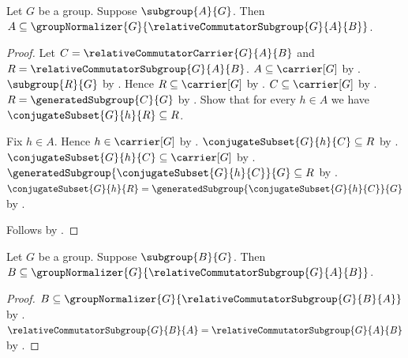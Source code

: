 \begin{theorem}\label{left_subgroup_normalizes_relative_commutator}
    Let $G$ be a group.
    Suppose $\subgroup{A}{G}$.
    Then
        $A\subseteq
            \groupNormalizer{G}{
                \relativeCommutatorSubgroup{G}{A}{B}}$.
\end{theorem}
\begin{proof}
    Let $C=\relativeCommutatorCarrier{G}{A}{B}$ and
        $R=\relativeCommutatorSubgroup{G}{A}{B}$.
    $A\subseteq\carrier[G]$ by .
    $\subgroup{R}{G}$ by
        .
    Hence $R\subseteq\carrier[G]$ by .
    $C\subseteq\carrier[G]$ by
        .
    $R=\generatedSubgroup{C}{G}$ by
        .
    Show that for every $h\in A$ we have
        $\conjugateSubset{G}{h}{R}\subseteq R$.
    \begin{subproof}
        Fix $h\in A$.
        Hence $h\in\carrier[G]$ by .
        $\conjugateSubset{G}{h}{C}\subseteq R$ by
            .
        $\conjugateSubset{G}{h}{C}\subseteq\carrier[G]$ by
            .
        $\generatedSubgroup{\conjugateSubset{G}{h}{C}}{G}
            \subseteq R$ by
            .
        $\conjugateSubset{G}{h}{R}=
            \generatedSubgroup{\conjugateSubset{G}{h}{C}}{G}$ by
            .
    \end{subproof}
    Follows by
        .
\end{proof}

\begin{theorem}\label{right_subgroup_normalizes_relative_commutator}
    Let $G$ be a group.
    Suppose $\subgroup{B}{G}$.
    Then
        $B\subseteq
            \groupNormalizer{G}{
                \relativeCommutatorSubgroup{G}{A}{B}}$.
\end{theorem}
\begin{proof}
    $B\subseteq
        \groupNormalizer{G}{
            \relativeCommutatorSubgroup{G}{B}{A}}$ by
        .
    $\relativeCommutatorSubgroup{G}{B}{A}=
        \relativeCommutatorSubgroup{G}{A}{B}$ by
        .
\end{proof}

